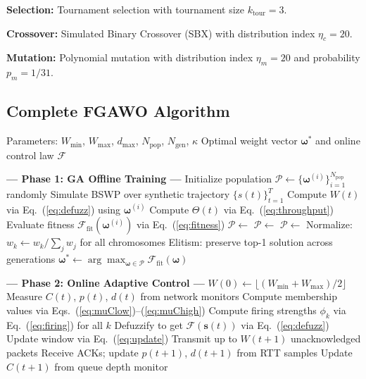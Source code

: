 \documentclass[10pt, twocolumn]{IEEEtran}
\theoremstyle{definition}
\begin{document}
\textbf{Selection:} Tournament selection with tournament size $k_{\text{tour}} = 3$.

\textbf{Crossover:} Simulated Binary Crossover (SBX) with distribution index $\eta_c = 20$.

\textbf{Mutation:} Polynomial mutation with distribution index $\eta_m = 20$ and probability $p_m = 1/31$.

\subsection{Complete FGAWO Algorithm}

\begin{algorithm}[H]
\caption{FGAWO: Fuzzy-Genetic Adaptive Window Optimization}
\label{alg:fgawo}
\begin{algorithmic}[1]
\Require Parameters: $W_{\min}$, $W_{\max}$, $d_{\max}$, $N_{\text{pop}}$, $N_{\text{gen}}$, $\kappa$
\Ensure Optimal weight vector $\boldsymbol{\omega}^*$ and online control law $\mathcal{F}$

\Statex \textbf{--- Phase 1: GA Offline Training ---}
\State Initialize population $\mathcal{P} \leftarrow \{\boldsymbol{\omega}^{(i)}\}_{i=1}^{N_{\text{pop}}}$ randomly
    \State Simulate BSWP over synthetic trajectory $\{s(t)\}_{t=1}^{T}$
    \State Compute $W(t)$ via Eq.~(\ref{eq:defuzz}) using $\boldsymbol{\omega}^{(i)}$
    \State Compute $\Theta(t)$ via Eq.~(\ref{eq:throughput})
    \State Evaluate fitness $\mathcal{F}_{\text{fit}}(\boldsymbol{\omega}^{(i)})$ via Eq.~(\ref{eq:fitness})
  \EndFor
  \State $\mathcal{P} \leftarrow$ 
  \State $\mathcal{P} \leftarrow$ 
  \State $\mathcal{P} \leftarrow$ 
  \State Normalize: $w_k \leftarrow w_k / \sum_j w_j$ for all chromosomes
  \State Elitism: preserve top-1 solution across generations
\EndFor
\State $\boldsymbol{\omega}^* \leftarrow \arg\max_{\boldsymbol{\omega} \in \mathcal{P}} \mathcal{F}_{\text{fit}}(\boldsymbol{\omega})$

\Statex \textbf{--- Phase 2: Online Adaptive Control ---}
\State $W(0) \leftarrow \lfloor (W_{\min} + W_{\max})/2 \rfloor$ 
  \State Measure $C(t)$, $p(t)$, $d(t)$ from network monitors
  \State Compute membership values via Eqs.~(\ref{eq:muClow})--(\ref{eq:muChigh})
  \State Compute firing strengths $\phi_k$ via Eq.~(\ref{eq:firing}) for all $k$
  \State Defuzzify to get $\mathcal{F}(\mathbf{s}(t))$ via Eq.~(\ref{eq:defuzz})
  \State Update window via Eq.~(\ref{eq:update})
  \State Transmit up to $W(t+1)$ unacknowledged packets
  \State Receive ACKs; update $p(t+1)$, $d(t+1)$ from RTT samples
  \State Update $C(t+1)$ from queue depth monitor
\EndFor
\end{algorithmic}
\end{algorithm}
\end{document}
